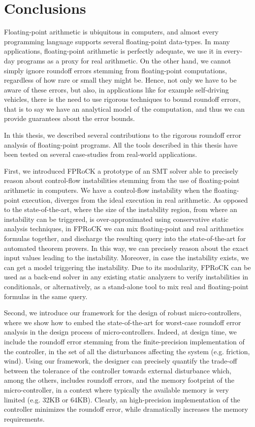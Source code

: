
\chapter{Conclusions}
\label{sec:conclusion}
%
Floating-point arithmetic is ubiquitous in computers, and almost every programming language supports several floating-point data-types.
%
In many applications, floating-point arithmetic is perfectly adequate, we use it in every-day programs as a proxy for real arithmetic.
%
On the other hand, we cannot simply ignore roundoff errors stemming from floating-point computations, regardless of how rare or small they might be.
%
Hence, not only we have to be aware of these errors, but also, in applications like for example self-driving vehicles, there is the need to use rigorous techniques to bound roundoff errors, that is to say we have an analytical model of the computation, and thus we can provide guarantees about the error bounds.
%

In this thesis, we described several contributions to the rigorous roundoff error analysis of floating-point programs.
%
All the tools described in this thesis have been tested on several case-studies from real-world applications.
%

First, we introduced FPRoCK a prototype of an SMT solver able to precisely reason about control-flow instabilities stemming from the use of floating-point arithmetic in computers.
%
We have a control-flow instability when the floating-point execution, diverges from the ideal execution in real arithmetic.
%
As opposed to the state-of-the-art, where the size of the instability region, from where an instability can be triggered, is over-approximated using conservative static analysis techniques, in FPRoCK we can mix floating-point and real arithmetics formulas together, and discharge the resulting query into the state-of-the-art for automated theorem provers. 
%
In this way, we can precisely reason about the exact input values leading to the instability. 
%
Moreover, in case the instability exists, we can get a model triggering the instability.
%
Due to its modularity, FPRoCK can be used as a back-end solver in any existing static analyzers to verify instabilities in conditionals, or alternatively, as a stand-alone tool to mix real and floating-point formulas in the same query.
%

Second, we introduce our framework for the design of robust micro-controllers, where we show how to embed the state-of-the-art for worst-case roundoff error analysis in the design process of micro-controllers.
%
Indeed, at design time, we include the roundoff error stemming from the finite-precision implementation of the controller, in the set of all the disturbances affecting the system (e.g. friction, wind).
%
Using our framework, the designer can precisely quantify the trade-off between the tolerance of the controller towards external disturbance which, among the others, includes roundoff errors, and the memory footprint of the micro-controller, in a context where typically the available memory is very limited (e.g. 32KB or 64KB).
%
Clearly, an high-precision implementation of the controller minimizes the roundoff error, while dramatically increases the memory requirements. 
%

